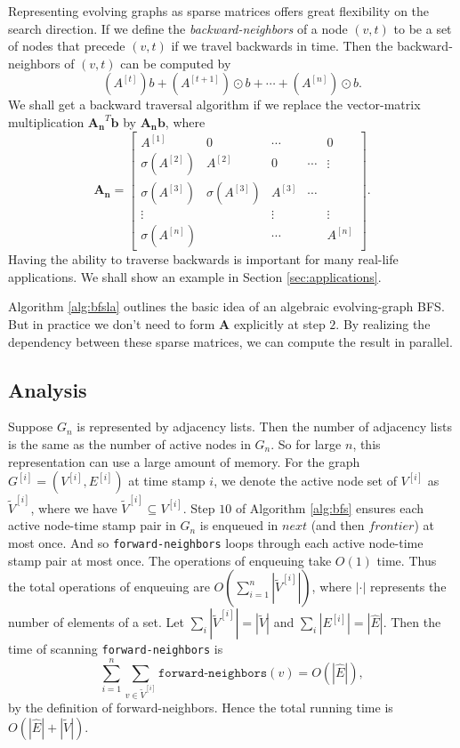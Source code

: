 \documentclass[11pt,conference,compsocconf]{IEEEtran}
\theoremstyle{definition}
\begin{document}
Representing evolving graphs as sparse matrices offers great flexibility
on the search direction. If we define the \emph{backward-neighbors} of a
node $(v,t)$ to be a set of nodes that precede $(v,t)$ if we travel backwards
in time. Then the backward-neighbors of $(v,t)$ can be computed by
\begin{equation}
\label{eq:backward}
(A^{[t]})b + (A^{[t+1]})\odot b + \cdots + (A^{[n]})\odot b.
\end{equation}
We shall get a backward traversal algorithm if we replace
the vector-matrix multiplication $\bm{A_n}^T\bm{b}$
by $\bm{A_n}\bm{b}$, where
\[
\bm{A_n} =
\begin{bmatrix}
A^{[1]} &   0            & \cdots  &  & 0 \\
\sigma(A^{[2]}) & A^{[2]} & 0         &\cdots  & \vdots \\
\sigma(A^{[3]}) & \sigma(A^{[3]}) & A^{[3]} & \cdots \\
   \vdots              &                              &      \vdots            &  &  \vdots \\
\sigma(A^{[n]}) &                  &       \cdots                      &  & A^{[n]}
\end{bmatrix}.
\]
Having the ability to traverse backwards is important for many real-life applications.
We shall show an example in Section \ref{sec:applications}.

Algorithm \ref{alg:bfsla} outlines the basic idea of an algebraic evolving-graph BFS.
But in practice we don't need to form $\bm{A}$ explicitly at step $2$. By realizing the dependency between these sparse matrices,
we can compute  the result in parallel.

\subsection{Analysis}
\label{sec:analysis}

Suppose $G_n$ is represented by adjacency lists.
Then the number of adjacency lists is the same as the number
of active nodes in $G_n$. So for large $n$, this representation
can use a large amount of memory.
For the graph $G^{[i]} = (V^{[i]}, E^{[i]})$ at time stamp $i$,
we denote the active node set of $V^{[i]}$ as $\tilde V^{[i]}$,
where we have $\tilde V^{[i]} \subseteq V^{[i]}$.
Step $10$ of  Algorithm \ref{alg:bfs} ensures each active node-time stamp pair in $G_n$ is enqueued in $next$ (and then $frontier$) at most once.
And so \texttt{forward-neighbors} loops through each
active node-time stamp pair at most once.
The operations of enqueuing take $O(1)$ time.
Thus the total operations of enqueuing are
$O(\sum_{i=1}^n|\tilde V^{[i]}|)$, where $|\cdot|$ represents the number of elements of a set.  Let $\sum_i |\tilde V^{[i]}| = |\tilde V|$ and $\sum_i |E^{[i]}| = |\hat E|$.
Then the time of scanning
\texttt{forward-neighbors} is
\[
\sum_{i=1}^n\sum_{v \in \tilde V^{[i]}} \texttt{forward-neighbors}(v) =
O(|\hat E|),
\]
by the definition of forward-neighbors.
Hence the total running time is $O(|\hat E|+ |\tilde V|)$.
\end{document}
